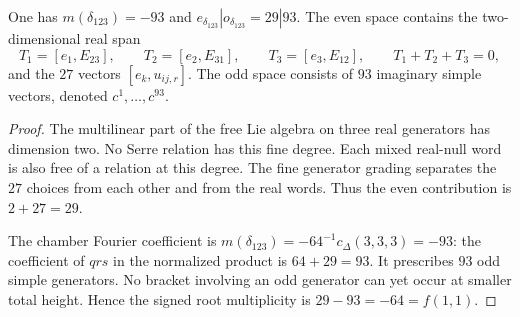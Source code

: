\begin{proposition}
\label{prop:bkm-delta123-presentation-count}
One has $m(\delta_{123})=-93$ and
$e_{\delta_{123}}|o_{\delta_{123}}=29|93$.
The even space contains the two-dimensional real span
\[
 T_1=[e_1,E_{23}],\qquad T_2=[e_2,E_{31}],\qquad
 T_3=[e_3,E_{12}],\qquad T_1+T_2+T_3=0,
\]
and the $27$ vectors $[e_k,u_{ij,r}]$. The odd space consists of
$93$ imaginary simple vectors, denoted $c^1,\ldots,c^{93}$.
\end{proposition}
\begin{proof}
The multilinear part of the free Lie algebra on three real generators
has dimension two. No Serre relation has this fine degree.
Each mixed real-null word is also free of a relation at this degree.
The fine generator grading separates the $27$ choices from each
other and from the real words. Thus the even contribution is
$2+27=29$.

The chamber Fourier coefficient is
$m(\delta_{123})=-64^{-1}c_\Delta(3,3,3)=-93$:
the coefficient of $qrs$ in the normalized product is $64+29=93$.
It prescribes $93$ odd simple generators. No bracket involving an
odd generator can yet occur at smaller total height. Hence the
signed root multiplicity is $29-93=-64=f(1,1)$.
\end{proof}

